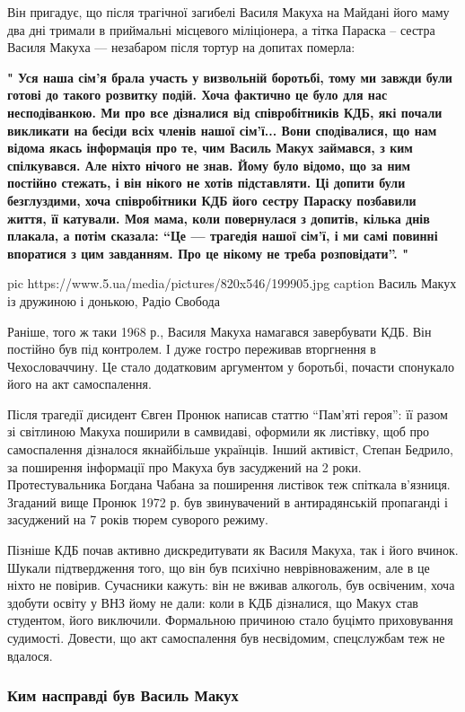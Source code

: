Він пригадує, що після трагічної загибелі Василя Макуха на Майдані його
маму два дні тримали в приймальні місцевого міліціонера, а тітка Параска –
сестра Василя Макуха --- незабаром після тортур на допитах померла:

{\bfseries
"
Уся наша сім'я брала участь у визвольній боротьбі, тому ми завжди були
готові до такого розвитку подій. Хоча фактично це було для нас
несподіванкою. Ми про все дізналися від співробітників КДБ, які почали
викликати на бесіди всіх членів нашої сім'ї... Вони сподівалися, що нам
відома якась інформація про те, чим Василь Макух займався, з ким
спілкувався. Але ніхто нічого не знав. Йому було відомо, що за ним
постійно стежать, і він нікого не хотів підставляти. Ці допити були
безглуздими, хоча співробітники КДБ його сестру Параску позбавили життя,
її катували. Моя мама, коли повернулася з допитів, кілька днів плакала,
а потім сказала: \enquote{Це --- трагедія нашої сім'ї, і ми самі повинні впоратися
з цим завданням. Про це нікому не треба розповідати}.
"
}

\ifcmt
pic https://www.5.ua/media/pictures/820x546/199905.jpg
caption Василь Макух із дружиною і донькою, Радіо Свобода
\fi

Раніше, того ж таки 1968 р., Василя Макуха намагався завербувати КДБ. Він
постійно був під контролем. І дуже гостро переживав вторгнення в
Чехословаччину. Це стало додатковим аргументом у боротьбі, почасти
спонукало його на акт самоспалення.

Після трагедії дисидент Євген Пронюк написав статтю \enquote{Пам'яті героя}: її
разом зі світлиною Макуха поширили в самвидаві, оформили як листівку, щоб
про самоспалення дізналося якнайбільше українців. Інший активіст, Степан
Бедрило, за поширення інформації про Макуха був засуджений на 2 роки.
Протестувальника Богдана Чабана за поширення листівок теж спіткала
в'язниця. Згаданий вище Пронюк 1972 р. був звинувачений в антирадянській
пропаганді і засуджений на 7 років тюрем суворого режиму.

Пізніше КДБ почав активно дискредитувати як Василя Макуха, так і його
вчинок. Шукали підтвердження того, що він був психічно неврівноваженим,
але в це ніхто не повірив. Сучасники кажуть: він не вживав алкоголь, був
освіченим, хоча здобути освіту у ВНЗ йому не дали: коли в КДБ дізналися,
що Макух став студентом, його виключили. Формальною причиною стало буцімто
приховування судимості. Довести, що акт самоспалення був несвідомим,
спецслужбам теж не вдалося.

\subsubsection{Ким насправді був Василь Макух}

